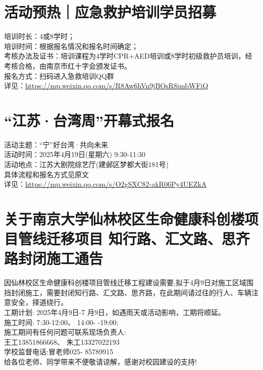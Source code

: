 \documentclass[letterpaper, 12pt]{article}
\begin{document}
\begin{multicols}{2}
\section{活动预热｜应急救护培训学员招募}
培训时长：4或8学时；
\\培训时间：根据报名情况和报名时间确定；
\\考核办法及证书：培训课程为4学时CPR+AED培训或8学时初级救护员培训，经考核合格，由南京市红十字会颁发证书。
\\报名方式：扫码进入急救培训QQ群
\\详见：\url{https://mp.weixin.qq.com/s/R8Aw6hVn9jBOsR8imbWFiQ}

\section{“江苏·台湾周”开幕式报名}
活动主题：“宁”好台湾·共向未来
\\活动时间：2025年4月19日(星期六)  9:30-11:30
\\活动地点：江苏大剧院综艺厅(建邺区梦都大街181号)
\\具体流程和报名方式见原文
\\详见：\url{https://mp.weixin.qq.com/s/O2gSXC82-akR06Py4UEZkA}

\section{关于南京大学仙林校区生命健康科创楼项目管线迁移项目  知行路、汇文路、思齐路封闭施工通告}
因仙林校区生命健康科创楼项目管线迁移工程建设需要,拟于4月9日对施工区域围挡封闭施工，需要封闭知行路、汇文路、思齐路，在此期间请过往的行人、车辆注意安全，择道绕行。
\\工期计划: 2025年4月9日-7 月9日，如遇雨天或活动影响，工期将顺延。
\\施工时间: 7:30-12:00、 14:00- -19:00;
\\施工期间有任何问题可联系现场负责人:
\\王工13851866668、 朱工13327022193
\\学校监督电话:冒老师025- 85789915
\\给各位老师、同学带来不便敬请谅解，感谢对校园建设的支持!


\end{multicols}
\end{document}
